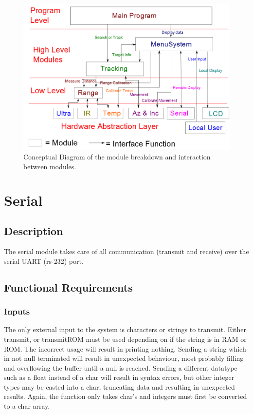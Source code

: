 \documentclass[]{report}
\begin{document}
\begin{figure}
\centering
\includegraphics[width=0.7\linewidth]{../Diagrams/Modules}
\caption[Modules]{Conceptual Diagram of the module breakdown and interaction between modules.}
\label{fig:Modules}
\end{figure}



\section{Serial}
\subsection{Description}
The serial module takes care of all communication (transmit and receive) over the serial UART (rs-232) port.

\subsection{Functional Requirements}
\subsubsection{Inputs}
The only external input to the system is characters or strings to transmit. \newline 
Either transmit, or transmitROM must be used depending on if the string is in RAM or ROM. The incorrect usage will result in printing nothing. \newline
Sending a string which in not null terminated will result in unexpected behaviour, most probably filling and overflowing the buffer until a null is reached. \newline
Sending a different datatype such as a float instead of a char will result in syntax errors, but other integer types may be casted into a char, truncating data and resulting in unexpected results. Again, the function only takes char's and integers must first be converted to a char array.
\end{document}
